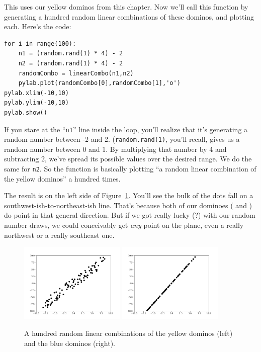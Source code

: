 This uses our yellow dominos from this chapter. Now we'll call this function by
generating a hundred random linear combinations of these dominos, and plotting
each. Here's the code:

\begin{Verbatim}[fontsize=\small,samepage=true,frame=single,framesep=3mm]
for i in range(100):
    n1 = (random.rand(1) * 4) - 2
    n2 = (random.rand(1) * 4) - 2
    randomCombo = linearCombo(n1,n2)
    pylab.plot(randomCombo[0],randomCombo[1],'o')
pylab.xlim(-10,10)
pylab.ylim(-10,10)
pylab.show()
\end{Verbatim}

If you stare at the ``\texttt{n1}'' line inside the loop, you'll realize that
it's generating a random number between -2 and 2. (\texttt{random.rand(1)},
you'll recall, gives us a random number between 0 and 1. By multiplying that
number by 4 and subtracting 2, we've spread its possible values over the
desired range. We do the same for \texttt{n2}. So the function is basically
plotting ``a random linear combination of the yellow dominos'' a hundred times.

The result is on the left side of Figure~\ref{fig:plot}. You'll see the bulk of
the dots fall on a southwest-ish-to-northeast-ish line. That's because both
of our dominoes (
and
 )
do point in that general direction. But if we got really lucky (?) with our
random number draws, we could conceivably get \textit{any} point on the plane,
even a really northwest or a really southeast one.

\begin{figure}[ht]
\centering
\includegraphics[width=0.45\textwidth]{plot_yellow.png}
\includegraphics[width=0.45\textwidth]{plot_blue.png}
\caption{A hundred random linear combinations of the yellow dominos (left) and
the blue dominos (right).}
\label{fig:plot}
\end{figure}

